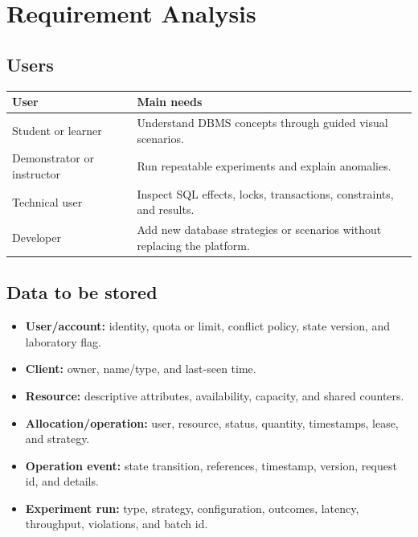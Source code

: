 \documentclass[12pt,a4paper]{article}
\begin{document}
\section{Requirement Analysis}

\subsection{Users}
\begin{longtable}{p{}p{}}
\toprule
\textbf{User} & \textbf{Main needs}\\
\midrule
Student or learner & Understand DBMS concepts through guided visual scenarios.\\
Demonstrator or instructor & Run repeatable experiments and explain anomalies.\\
Technical user & Inspect SQL effects, locks, transactions, constraints, and results.\\
Developer & Add new database strategies or scenarios without replacing the platform.\\
\bottomrule
\end{longtable}

\subsection{Data to be stored}
\begin{itemize}
\item \textbf{User/account:} identity, quota or limit, conflict policy, state version, and laboratory flag.
\item \textbf{Client:} owner, name/type, and last-seen time.
\item \textbf{Resource:} descriptive attributes, availability, capacity, and shared counters.
\item \textbf{Allocation/operation:} user, resource, status, quantity, timestamps, lease, and strategy.
\item \textbf{Operation event:} state transition, references, timestamp, version, request id, and details.
\item \textbf{Experiment run:} type, strategy, configuration, outcomes, latency, throughput, violations, and batch id.
\end{itemize}
\end{document}
